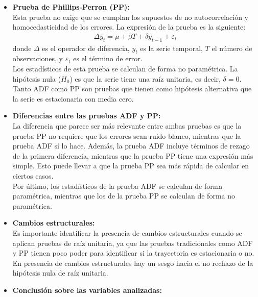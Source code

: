 \documentclass[12pt]{article}
\begin{document}
\begin{itemize}
    \item \textbf{Prueba de Phillips-Perron (PP):} \\
    Esta prueba no exige que se cumplan los supuestos de no autocorrelación y
    homocedasticidad de los errores. La expresión de la prueba es la siguiente:
    \begin{align}
        \Delta y_t = \mu + \beta T + \delta y_{t-1} + \varepsilon_t
    \end{align}
    donde $\Delta$ es el operador de diferencia, $y_t$ es la serie temporal,
    $T$ el número de observaciones, y $\varepsilon_t$ es el término de error.\\
    Los estadísticos de esta prueba se calculan de forma no paramétrica. La hipótesis nula ($H_0$) es que la serie tiene una raíz
    unitaria, es decir, $\delta=0$.\\
    Tanto ADF como PP son pruebas que tienen como hipótesis alternativa 
    que la serie es estacionaria con media cero.

    \item \textbf{Diferencias entre las pruebas ADF y PP:} \\
    La diferencia que parece ser más relevante entre ambas pruebas es que la prueba PP
    no requiere que los errores sean ruido blanco, mientras que la prueba ADF sí lo hace.
    Además, la prueba ADF incluye términos de rezago de la primera diferencia, 
    mientras que la prueba PP tiene una expresión más simple. Esto puede llevar
    a que la prueba PP sea más rápida de calcular en ciertos casos.\\
    Por último, los estadísticos de la prueba ADF se calculan de forma paramétrica, mientras que
    los de la prueba PP se calculan de forma no paramétrica.\\

    \item \textbf{Cambios estructurales:}\\
    Es importante identificar la presencia de cambios estructurales cuando 
    se aplican pruebas de raíz unitaria, ya que las pruebas tradicionales como ADF y PP
    tienen poco poder para identificar si la trayectoria es estacionaria o no. 
    En presencia de cambios estructurales hay un sesgo hacia el no rechazo 
    de la hipótesis nula de raíz unitaria.

    \item \textbf{Conclusión sobre las variables analizadas:}\\
    
    
\end{itemize}




\end{document}
